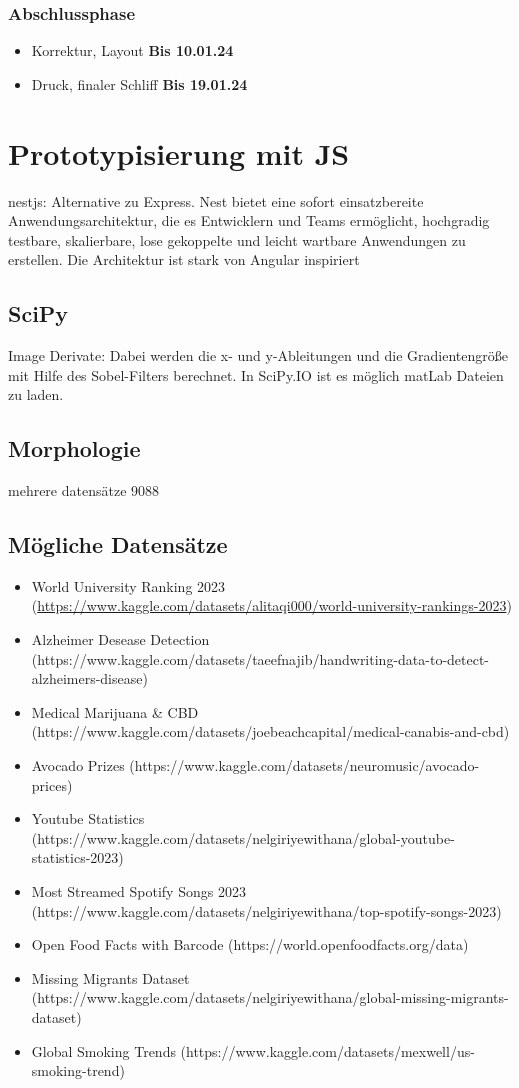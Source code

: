 \subsubsection*{Abschlussphase}
\begin{itemize}
    \item Korrektur, Layout \textbf{Bis 10.01.24}
    \item Druck, finaler Schliff \textbf{Bis 19.01.24}
\end{itemize}

\section{Prototypisierung mit JS}
nestjs: Alternative zu Express. Nest bietet eine sofort einsatzbereite Anwendungsarchitektur, die es Entwicklern und Teams ermöglicht, hochgradig testbare, skalierbare, lose gekoppelte und leicht wartbare Anwendungen zu erstellen. Die Architektur ist stark von Angular inspiriert

\subsection*{SciPy}
Image Derivate: Dabei werden die x- und y-Ableitungen und die Gradientengröße mit Hilfe des Sobel-Filters berechnet. 
In SciPy.IO ist es möglich matLab Dateien zu laden.


\subsection*{Morphologie}
mehrere datensätze 9088

\subsection*{Mögliche Datensätze}
\begin{itemize}
    \item World University Ranking 2023 (\url{https://www.kaggle.com/datasets/alitaqi000/world-university-rankings-2023})
    \item Alzheimer Desease Detection (https://www.kaggle.com/datasets/taeefnajib/handwriting-data-to-detect-alzheimers-disease)
    \item Medical Marijuana \& CBD (https://www.kaggle.com/datasets/joebeachcapital/medical-canabis-and-cbd)
    \item Avocado Prizes (https://www.kaggle.com/datasets/neuromusic/avocado-prices)
    \item Youtube Statistics (https://www.kaggle.com/datasets/nelgiriyewithana/global-youtube-statistics-2023)
    \item Most Streamed Spotify Songs 2023 (https://www.kaggle.com/datasets/nelgiriyewithana/top-spotify-songs-2023)
    \item Open Food Facts with Barcode (https://world.openfoodfacts.org/data)
    \item Missing Migrants Dataset (https://www.kaggle.com/datasets/nelgiriyewithana/global-missing-migrants-dataset)
    \item Global Smoking Trends (https://www.kaggle.com/datasets/mexwell/us-smoking-trend)
\end{itemize}